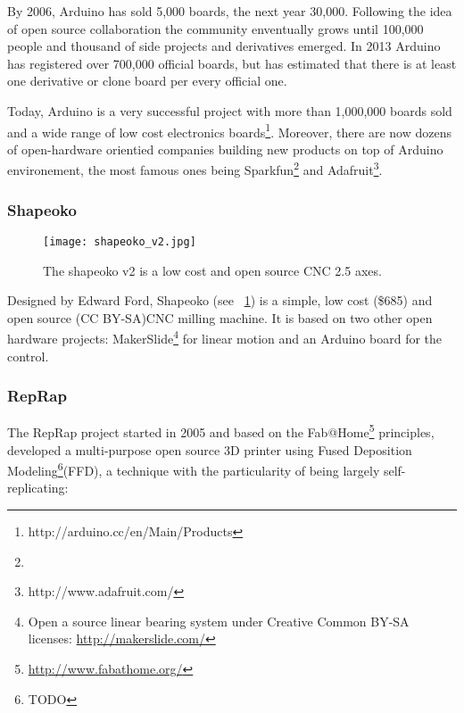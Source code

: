 By 2006, Arduino has sold 5,000 boards, the next year 30,000. Following the idea of open source collaboration the community enventually grows until 100,000 people and thousand of side projects and derivatives emerged. In 2013 Arduino has registered over 700,000 official boards, but has estimated that there is at least one derivative or clone board per every official one.

Today, Arduino is a very successful project with more than 1,000,000 boards sold and a wide range of low cost electronics boards\footnote{http://arduino.cc/en/Main/Products}. Moreover, there are now dozens of open-hardware orientied companies building new products on top of Arduino environement, the most famous ones being Sparkfun\footnote{} and Adafruit\footnote{http://www.adafruit.com/}.

\subsubsection{Shapeoko}

\begin{figure}[!ht]
    \begin{center}
        \texttt{[image: shapeoko\_v2.jpg]}
    \end{center}
    \caption{The shapeoko v2 is a low cost and open source CNC 2.5 axes.}
    \label{fig:shapeoko}
\end{figure}

Designed by Edward Ford, Shapeoko (see \figurename~\ref{fig:shapeoko}) is a simple, low cost (\$685) and open source (CC BY-SA)CNC milling machine. It is based on two other open hardware projects: MakerSlide\footnote{Open a source linear bearing system under Creative Common BY-SA licenses: \url{http://makerslide.com/}} for linear motion and an Arduino board for the control.



\subsubsection{RepRap} %

The RepRap project started in 2005 and based on the Fab@Home\footnote{\url{http://www.fabathome.org/}} principles, developed a multi-purpose open source 3D printer using Fused Deposition Modeling\footnote{TODO}(FFD), a technique with the particularity of being largely self-replicating:

